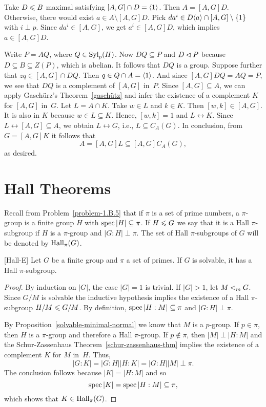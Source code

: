 \begin{solution}
\begin{description}
    Take $D\leqslant B$ maximal satisfying $[A,G]\cap D=\langle1\rangle$. Then $A=[A,G]D$. Otherwise, there would exist $a\in A\setminus[A,G]D$. Pick $da^i\in D\langle a\rangle\cap[A,G]\setminus\{1\}$ with $i\perp p$. Since $da^i\in[A,G]$, we get $a^i\in[A,G]D$, which implies $a\in[A,G]D$.

    Write $P=AQ$, where $Q\in{\rm Syl}_p(H)$. Now $DQ\subseteq P$ and $D\lhd P$ because $D\subseteq B\subseteq Z(P)$, which is abelian. It follows that $DQ$ is a group. Suppose further that $zq\in [A,G]\cap DQ$. Then $q\in Q\cap A=\langle1\rangle$. And since $[A,G]DQ=AQ=P$, we see that $DQ$ is a complement of $[A,G]$ in~$P$. Since $[A,G]\subseteq A$, we can apply Gasch\"urz's Theorem~\ref{gaschütz} and infer the existence of a complement $K$ for $[A,G]$ in~$G$. Let $L=A\cap K$. Take $w\in L$ and $k\in K$. Then $[w,k]\in[A,G]$. It is also in $K$ because $w\in L\subseteq K$. Hence, $[w,k]=1$ and $L\leftrightarrow K$. Since $L\leftrightarrow [A,G]\subseteq A$, we obtain $L\leftrightarrow G$, i.e., $L\subseteq C_A(G)$. In conclusion, from $G=[A,G]K$ it follows that
    $$
        A=[A,G]L\subseteq [A,G]C_A(G),
    $$
    as desired.
\end{description}
\end{solution}


\section{Hall Theorems}
Recall from Problem~\ref{problem-1.B.5} that if $\pi$ is a set of prime numbers, a $\pi$-group is a finite group $H$ with $\operatorname{spec}|H|\subseteq\pi$. If $H\leqslant G$ we say that it is a Hall $\pi$-subgroup if $H$ is a $\pi$-group and $|G:H|\perp\pi$. The set of Hall $\pi$-subgroups of $G$ will be denoted by ${\rm Hall}_\pi(G)$.

\begin{thm}{\rm[Hall-E]}\label{hall-e}
    Let\/ $G$ be a finite group and $\pi$ a set of primes. If\/ $G$ is solvable, it has a Hall\/ $\pi$-subgroup.
\end{thm}

\begin{proof} By induction on $|G|$, the case $|G|=1$ is trivial. If $|G|>1$, let $M\lhd_mG$. Since $G/M$ is solvable the inductive hypothesis implies the existence of a Hall $\pi$-subgroup $H/M\leqslant G/M$. By definition, $\operatorname{spec}|H:M|\subseteq\pi$ and $|G:H|\perp\pi$.

By Proposition~\ref{solvable-minimal-normal} we know that $M$ is a $p$-group. If $p\in\pi$, then $H$ is a $\pi$-group and therefore a Hall $\pi$-group. If $p\notin\pi$, then $|M|\perp|H:M|$ and the Schur-Zassenhaus Theorem~\ref{schur-zassenhaus-thm} implies the existence of a complement $K$ for $M$ in~$H$. Thus,
$$
    |G:K|=|G:H||H:K|=|G:H||M|\perp\pi.
$$
The conclusion follows because $|K|=|H:M|$ and so
$$
    \operatorname{spec}|K|=\operatorname{spec}|H:M|\subseteq\pi,
$$
which shows that $K\in{\rm Hall}_\pi(G)$.  \end{proof}


